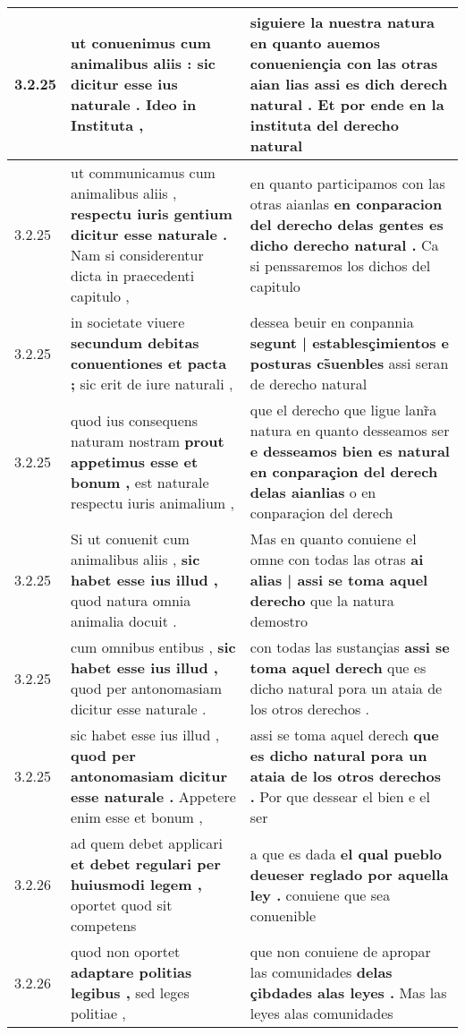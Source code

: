 \begin{tabular}{|p{1cm}|p{6.5cm}|p{6.5cm}|}
3.2.25 & ut conuenimus cum animalibus aliis : \textbf{ sic dicitur esse ius naturale . } Ideo in Instituta , & siguiere la nuestra natura en quanto auemos conueniençia con las otras aian lias \textbf{ assi es dich derech natural . } Et por ende en la instituta del derecho natural \\\hline
3.2.25 & ut communicamus cum animalibus aliis , \textbf{ respectu iuris gentium dicitur esse naturale . } Nam si considerentur dicta in praecedenti capitulo , & en quanto participamos con las otras aianlas \textbf{ en conparacion del derecho delas gentes es dicho derecho natural . } Ca si penssaremos los dichos del capitulo \\\hline
3.2.25 & in societate viuere \textbf{ secundum debitas conuentiones et pacta ; } sic erit de iure naturali , & dessea beuir en conpannia \textbf{ segunt | establesçimientos e posturas cs̃uenbles } assi seran de derecho natural \\\hline
3.2.25 & quod ius consequens naturam nostram \textbf{ prout appetimus esse et bonum , } est naturale respectu iuris animalium , & que el derecho que ligue lanr̃a natura en quanto desseamos ser \textbf{ e desseamos bien es natural en conparaçion del derech delas aianlias } o en conparaçion del derech \\\hline
3.2.25 & Si ut conuenit cum animalibus aliis , \textbf{ sic habet esse ius illud , } quod natura omnia animalia docuit . & Mas en quanto conuiene el omne con todas las otras \textbf{ ai alias | assi se toma aquel derecho } que la natura demostro \\\hline
3.2.25 & cum omnibus entibus , \textbf{ sic habet esse ius illud , } quod per antonomasiam dicitur esse naturale . & con todas las sustançias \textbf{ assi se toma aquel derech } que es dicho natural pora un ataia de los otros derechos . \\\hline
3.2.25 & sic habet esse ius illud , \textbf{ quod per antonomasiam dicitur esse naturale . } Appetere enim esse et bonum , & assi se toma aquel derech \textbf{ que es dicho natural pora un ataia de los otros derechos . } Por que dessear el bien e el ser \\\hline
3.2.26 & ad quem debet applicari \textbf{ et debet regulari per huiusmodi legem , } oportet quod sit competens & a que es dada \textbf{ el qual pueblo deueser reglado por aquella ley . } conuiene que sea conuenible \\\hline
3.2.26 & quod non oportet \textbf{ adaptare politias legibus , } sed leges politiae , & que non conuiene de apropar las comunidades \textbf{ delas çibdades alas leyes . } Mas las leyes alas comunidades \\\hline

\end{tabular}

